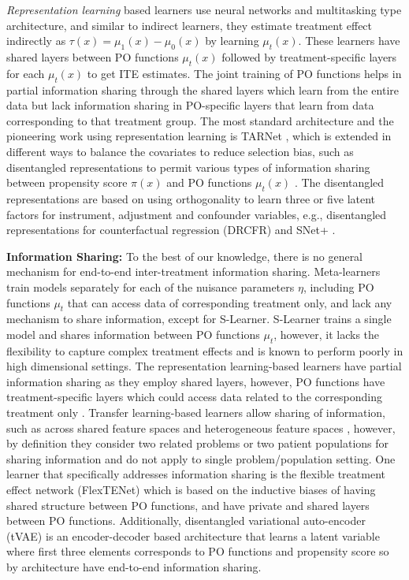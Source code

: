 \documentclass{article}
\begin{document}
\textit{Representation learning} based learners use neural networks and multitasking type architecture, and similar to indirect learners, they estimate treatment effect indirectly as $\tau(x) = \mu_1(x) - \mu_0(x)$ by learning $\mu_t(x)$. These learners have shared layers between PO functions $\mu_t(x)$ followed by treatment-specific layers for each $\mu_t(x)$ to get ITE estimates. The joint training of PO functions helps in partial information sharing through the shared layers which learn from the entire data but lack information sharing in PO-specific layers that learn from data corresponding to that treatment group. The most standard architecture and the pioneering work using representation learning is TARNet \cite{johansson2016learning}, which is extended in different ways to balance the covariates to reduce selection bias, such as disentangled representations to permit various types of information sharing between propensity score $\pi(x)$ and PO functions $\mu_t(x)$ \cite{hassanpour2019learning,curth2021nonparametric}. The disentangled representations are based on using orthogonality to learn three or five latent factors for instrument, adjustment and confounder variables, e.g., disentangled representations for counterfactual regression (DRCFR) \cite{hassanpour2019learning} and SNet+ \cite{chauhan2023adversarial}.

\textbf{Information Sharing:} To the best of our knowledge, there is no general mechanism for end-to-end inter-treatment information sharing. Meta-learners \cite{kunzel2019metalearners} train models separately for each of the nuisance parameters $\eta$, including PO functions $\mu_t$ that can access data of corresponding treatment only, and lack any mechanism to share information, except for S-Learner. S-Learner trains a single model and shares information between PO functions $\mu_t$, however, it lacks the flexibility to capture complex treatment effects and is known to perform poorly in high dimensional settings. The representation learning-based learners have partial information sharing as they employ shared layers, however, PO functions have treatment-specific layers which could access data related to the corresponding treatment only \cite{johansson2016learning,curth2021nonparametric}. Transfer learning-based learners allow sharing of information, such as across shared feature spaces \cite{kunzel2018transfer} and heterogeneous feature spaces \cite{bica2022transfer}, however, by definition they consider two related problems or two patient populations for sharing information and do not apply to single problem/population setting. One learner that specifically addresses information sharing is the flexible treatment effect network (FlexTENet) \cite{curth2021inductive} which is based on the inductive biases of having shared structure between PO functions, and have private and shared layers between PO functions. Additionally, disentangled variational auto-encoder (tVAE) \cite{xue2023assisting} is an encoder-decoder based architecture that learns a latent variable where first three elements corresponds to PO functions and propensity score so by architecture have end-to-end information sharing.
\end{document}
